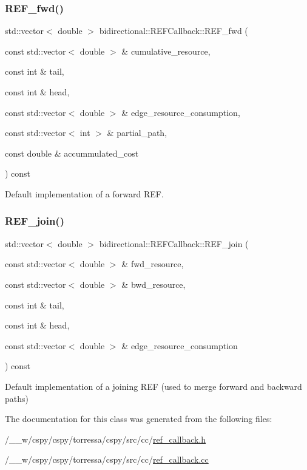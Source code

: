 \subsubsection{\texorpdfstring{R\+E\+F\+\_\+fwd()}{REF\_fwd()}}
{\footnotesize\ttfamily std\+::vector$<$ double $>$ bidirectional\+::\+R\+E\+F\+Callback\+::\+R\+E\+F\+\_\+fwd (\begin{DoxyParamCaption}\item[{const std\+::vector$<$ double $>$ \&}]{cumulative\+\_\+resource,  }\item[{const int \&}]{tail,  }\item[{const int \&}]{head,  }\item[{const std\+::vector$<$ double $>$ \&}]{edge\+\_\+resource\+\_\+consumption,  }\item[{const std\+::vector$<$ int $>$ \&}]{partial\+\_\+path,  }\item[{const double \&}]{accummulated\+\_\+cost }\end{DoxyParamCaption}) const\hspace{0.3cm}{\ttfamily [virtual]}}



Default implementation of a forward R\+EF. 

\mbox{\label{classbidirectional_1_1REFCallback_a82a485c94d647e74ee025a7dd3554224}} 
\subsubsection{\texorpdfstring{R\+E\+F\+\_\+join()}{REF\_join()}}
{\footnotesize\ttfamily std\+::vector$<$ double $>$ bidirectional\+::\+R\+E\+F\+Callback\+::\+R\+E\+F\+\_\+join (\begin{DoxyParamCaption}\item[{const std\+::vector$<$ double $>$ \&}]{fwd\+\_\+resource,  }\item[{const std\+::vector$<$ double $>$ \&}]{bwd\+\_\+resource,  }\item[{const int \&}]{tail,  }\item[{const int \&}]{head,  }\item[{const std\+::vector$<$ double $>$ \&}]{edge\+\_\+resource\+\_\+consumption }\end{DoxyParamCaption}) const\hspace{0.3cm}{\ttfamily [virtual]}}

Default implementation of a joining R\+EF (used to merge forward and backward paths) 

The documentation for this class was generated from the following files\+:\begin{DoxyCompactItemize}
\item 
/\+\_\+\+\_\+w/cspy/cspy/torressa/cspy/src/cc/\hyperlink{ref__callback_8h}{ref\+\_\+callback.\+h}\item 
/\+\_\+\+\_\+w/cspy/cspy/torressa/cspy/src/cc/\hyperlink{ref__callback_8cc}{ref\+\_\+callback.\+cc}\end{DoxyCompactItemize}

